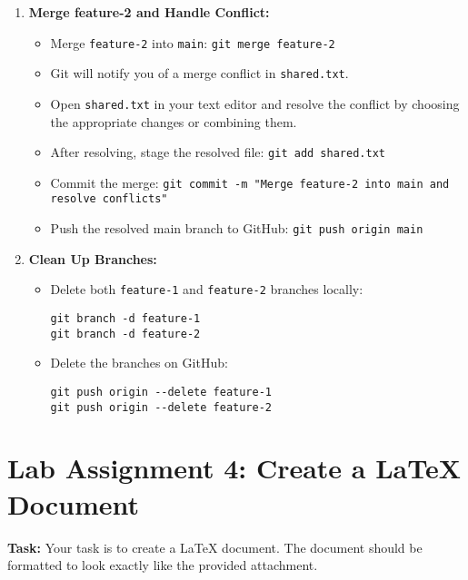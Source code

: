 \documentclass[a4paper,12pt]{report}
\begin{document}
\begin{enumerate}[label=\arabic*.]
    \item \textbf{Merge feature-2 and Handle Conflict:}
    \begin{itemize}
        \item Merge \texttt{feature-2} into \texttt{main}: \texttt{git merge feature-2}
        \item Git will notify you of a merge conflict in \texttt{shared.txt}.
        \item Open \texttt{shared.txt} in your text editor and resolve the conflict by choosing the appropriate changes or combining them.
        \item After resolving, stage the resolved file: \texttt{git add shared.txt}
        \item Commit the merge: \texttt{git commit -m "Merge feature-2 into main and resolve conflicts"}
        \item Push the resolved main branch to GitHub: \texttt{git push origin main}
    \end{itemize}

    \item \textbf{Clean Up Branches:}
    \begin{itemize}
        \item Delete both \texttt{feature-1} and \texttt{feature-2} branches locally:
        \begin{verbatim}
git branch -d feature-1
git branch -d feature-2
        \end{verbatim}
        \item Delete the branches on GitHub:
        \begin{verbatim}
git push origin --delete feature-1
git push origin --delete feature-2
        \end{verbatim}
    \end{itemize}
\end{enumerate}
\newpage
\section{Lab Assignment 4: Create a LaTeX Document}

\textbf{Task:} Your task is to create a LaTeX document. The document should be formatted to look exactly like the provided attachment.
\end{document}
